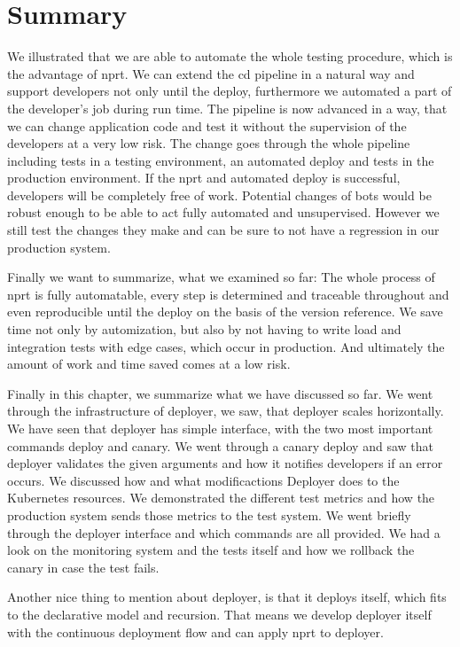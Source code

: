 \section{Summary}

We illustrated that we are able to automate the whole testing procedure, which is the
advantage of \gls{nprt}. We can extend the \gls{cd} pipeline in a natural way and support
developers not only until the deploy, furthermore we automated a part of the developer's
job during run time. The pipeline is now advanced in a way, that we can change application
code and test it without the supervision of the developers at a very low risk. The change
goes through the whole pipeline including tests in a testing environment, an automated
deploy and tests in the production environment. If the \gls{nprt} and automated deploy is
successful, developers will be completely free of work. Potential changes of bots would be
robust enough to be able to act fully automated and unsupervised. However we still test
the changes they make and can be sure to not have a regression in our production system.

Finally we want to summarize, what we examined so far: The whole process of \gls{nprt} is
fully automatable, every step is determined and traceable throughout and even reproducible
until the deploy on the basis of the version reference. We save time not only by
automization, but also by not having to write load and integration tests with edge cases,
which occur in production. And ultimately the amount of work and time saved comes at a low
risk.


Finally in this chapter, we summarize what we have discussed so far. We went through the
infrastructure of deployer, we saw, that deployer scales horizontally. We have seen that
deployer has simple interface, with the two most important commands deploy and canary. We
went through a canary deploy and saw that deployer validates the given arguments and how
it notifies developers if an error occurs. We discussed how and what modificactions
Deployer does to the Kubernetes resources. We demonstrated the different test metrics and
how the production system sends those metrics to the test system. We went briefly through
the deployer interface and which commands are all provided. We had a look on the
monitoring system and the tests itself and how we rollback the canary in case the test
fails.

Another nice thing to mention about deployer, is that it deploys itself, which fits to the
declarative model and recursion. That means we develop deployer itself with the continuous
deployment flow and can apply \gls{nprt} to deployer.



